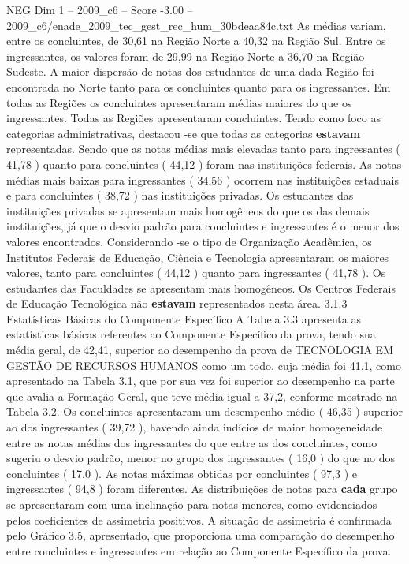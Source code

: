 \begin{textsample}{NEG Dim 1 – 2009\_c6 – Score -3.00 – 2009\_c6/enade\_2009\_tec\_gest\_rec\_hum\_30bdeaa84c.txt}
As médias variam, entre os concluintes, de 30,61 na Região Norte a 40,32 na Região Sul.
Entre os ingressantes, os valores foram de 29,99 na Região Norte a 36,70 na Região Sudeste.
A maior dispersão de notas dos estudantes de uma dada Região foi encontrada no Norte tanto para os concluintes quanto para os ingressantes.
Em todas as Regiões os concluintes apresentaram médias maiores do que os ingressantes.
Todas as Regiões apresentaram concluintes.
Tendo como foco as categorias administrativas, destacou -se que todas as categorias \textbf{estavam} representadas.
Sendo que as notas médias mais elevadas tanto para ingressantes ( 41,78 ) quanto para concluintes ( 44,12 ) foram nas instituições federais.
As notas médias mais baixas para ingressantes ( 34,56 ) ocorrem nas instituições estaduais e para concluintes ( 38,72 ) nas instituições privadas.
Os estudantes das instituições privadas se apresentam mais homogêneos do que os das demais instituições, já que o desvio padrão para concluintes e ingressantes é o menor dos valores encontrados.
Considerando -se o tipo de Organização Acadêmica, os Institutos Federais de Educação, Ciência e Tecnologia apresentaram os maiores valores, tanto para concluintes ( 44,12 ) quanto para ingressantes ( 41,78 ).
Os estudantes das Faculdades se apresentam mais homogêneos.
Os Centros Federais de Educação Tecnológica não \textbf{estavam} representados nesta área. 3.1.3 Estatísticas Básicas do Componente Específico A Tabela 3.3 apresenta as estatísticas básicas referentes ao Componente Específico da prova, tendo sua média geral, de 42,41, superior ao desempenho da prova de TECNOLOGIA EM GESTÃO DE RECURSOS HUMANOS como um todo, cuja média foi 41,1, como apresentado na Tabela 3.1, que por sua vez foi superior ao desempenho na parte que avalia a Formação Geral, que teve média igual a 37,2, conforme mostrado na Tabela 3.2.
Os concluintes apresentaram um desempenho médio ( 46,35 ) superior ao dos ingressantes ( 39,72 ), havendo ainda indícios de maior homogeneidade entre as notas médias dos ingressantes do que entre as dos concluintes, como sugeriu o desvio padrão, menor no grupo dos ingressantes ( 16,0 ) do que no dos concluintes ( 17,0 ).
As notas máximas obtidas por concluintes ( 97,3 ) e ingressantes ( 94,8 ) foram diferentes.
As distribuições de notas para \textbf{cada} grupo se apresentaram com uma inclinação para notas menores, como evidenciados pelos coeficientes de assimetria positivos.
A situação de assimetria é confirmada pelo Gráfico 3.5, apresentado, que proporciona uma comparação do desempenho entre concluintes e ingressantes em relação ao Componente Específico da prova.

\end{textsample}
